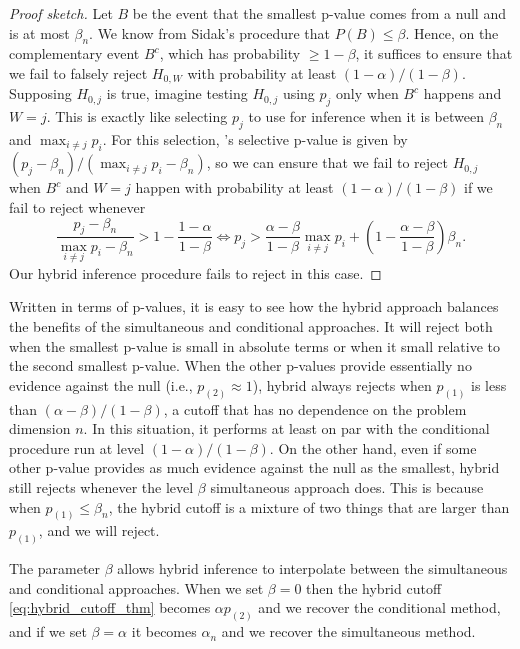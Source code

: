 \documentclass{article}
\begin{document}
\begin{proof}[Proof sketch]    
    Let $B$ be the event that the smallest p-value comes from a null and is at most $\beta_n$. We know from Sidak's procedure that $P(B) \leq \beta$. Hence, on the complementary event $B^c$, which has probability $\geq 1-\beta$, it suffices to ensure that we fail to falsely reject $H_{0, W}$ with probability at least $(1-\alpha)/(1-\beta)$. Supposing $H_{0, j}$ is true, imagine testing $H_{0, j}$ using $p_j$ only when $B^c$ happens and $W=j$. This is exactly like selecting $p_j$ to use for inference when it is between $\beta_n$ and $\max_{i \neq j} p_i $. For this selection, 's selective p-value is given by $(p_j - \beta_n)/(\max_{i \neq j} p_i  - \beta_n)$, so we can ensure that we fail to reject $H_{0, j}$ when $B^c$ and $W=j$ happen with probability at least $(1-\alpha)/(1-\beta)$ if we fail to reject whenever
    \begin{equation*}
        \frac{p_j - \beta_n}{\max_{i \neq j} p_i  - \beta_n} > 1 - \frac{1-\alpha}{1-\beta} \iff p_j > \frac{\alpha-\beta}{1-\beta} \max_{i \neq j} p_i + \left(1 - \frac{\alpha-\beta}{1-\beta}\right)\beta_n.
    \end{equation*}
    Our hybrid inference procedure fails to reject in this case.  
\end{proof}

Written in terms of p-values, it is easy to see how the hybrid approach balances the benefits of the simultaneous and conditional approaches. It will reject both when the smallest p-value is small in absolute terms or when it small relative to the second smallest p-value. When the other p-values provide essentially no evidence against the null (i.e., $p_{(2)} \approx 1$), hybrid always rejects when $p_{(1)}$ is less than $(\alpha-\beta)/(1-\beta)$, a cutoff that has no dependence on the problem dimension $n$. In this situation, it performs at least on par with the conditional procedure run at level $(1-\alpha)/(1-\beta)$. On the other hand, even if some other p-value provides as much evidence against the null as the smallest, hybrid still rejects whenever the level $\beta$ simultaneous approach does. This is because when $p_{(1)} \leq \beta_n$, the hybrid cutoff is a mixture of two things that are larger than $p_{(1)}$, and we will reject. 

The parameter $\beta$ allows hybrid inference to interpolate between the simultaneous and conditional approaches. When we set $\beta = 0$ then the hybrid cutoff \eqref{eq:hybrid_cutoff_thm} becomes $\alpha p_{(2)}$ and we recover the conditional method, and if we set $\beta=\alpha$ it becomes $\alpha_n$ and we recover the simultaneous method. 
\end{document}
